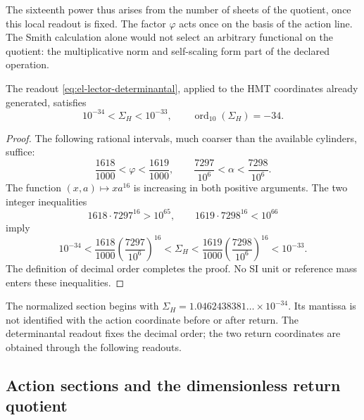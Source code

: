 The sixteenth power thus arises from the number of sheets of the quotient,
once this local readout is fixed. The factor \(\varphi\) acts once on
the basis of the action line. The Smith calculation alone would not
select an arbitrary functional on the quotient: the multiplicative norm
and self-scaling form part of the declared operation.

\begin{theorem}
The readout \eqref{eq:el-lector-determinantal}, applied to the HMT
coordinates already generated, satisfies
\begin{equation}
 10^{-34}<\Sigma_H<10^{-33},\qquad
 \operatorname{ord}_{10}(\Sigma_H)=-34.
 \label{eq:el-decada}
\end{equation}
\end{theorem}
\begin{proof}
The following rational intervals, much coarser than the available
cylinders, suffice:
\[
 \frac{1618}{1000}<\varphi<\frac{1619}{1000},\qquad
 \frac{7297}{10^6}<\alpha<\frac{7298}{10^6}.
\]
The function \((x,a)\mapsto xa^{16}\) is increasing in both positive
arguments. The two integer inequalities
\[
 1618\cdot7297^{16}>10^{65},\qquad
 1619\cdot7298^{16}<10^{66}
\]
imply
\[
 10^{-34}
 <\frac{1618}{1000}\left(\frac{7297}{10^6}\right)^{16}
 <\Sigma_H
 <\frac{1619}{1000}\left(\frac{7298}{10^6}\right)^{16}
 <10^{-33}.
\]
The definition of decimal order completes the proof. No SI unit
or reference mass enters these inequalities.
\end{proof}

The normalized section begins with
\(\Sigma_H=1.0462438381\ldots\times10^{-34}\). Its mantissa is not
identified with the action coordinate before or after return.
The determinantal readout fixes the decimal order; the two return
coordinates are obtained through the following readouts.


\subsection{Action sections and the dimensionless return quotient}


